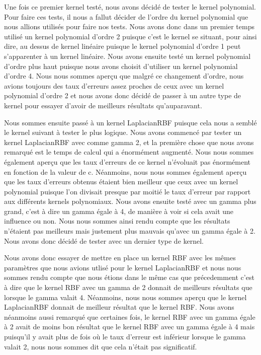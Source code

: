 \documentclass[fontsize=10pt, twoside=no]{scrartcl} %
\begin{document}
Une fois ce premier kernel testé, nous avons décidé de tester le kernel polynomial. Pour faire ces tests, il nous a fallut décider de l'ordre du kernel polynomial que nous allions utilisés pour faire nos tests. Nous avons donc dans un premier temps utilisé un kernel polynomial d'ordre 2 puisque c'est le kernel se situant, pour ainsi dire, au dessus de kernel linéaire puisque le kernel polynomial d'ordre 1 peut s'apparenter à un kernel linéaire. Nous avons ensuite testé un kernel polynomial d'ordre plus haut puisque nous avons choisit d'utiliser un kernel polynomial d'ordre 4. Nous nous sommes aperçu que malgré ce changement d'ordre, nous avions toujours des taux d'erreurs assez proches de ceux avec un kernel polynomial d'ordre 2 et nous avons donc décidé de passer à un autre type de kernel pour essayer d'avoir de meilleurs résultats qu'auparavant.

Nous sommes ensuite passé à un kernel LaplacianRBF puisque cela nous a semblé le kernel suivant à tester le plus logique. Nous avons commencé par tester un kernel LaplacianRBF avec comme gamma 2, et la première chose que nous avons remarqué est le temps de calcul qui a énormément augmenté. Nous nous sommes également aperçu que les taux d'erreurs de ce kernel n'évoluait pas énormément en fonction de la valeur de c. Néanmoins, nous nous sommes également aperçu que les taux d'erreurs obtenus étaient bien meilleur que ceux avec un kernel polynomial puisque l'on divisait presque par moitié le taux d'erreur par rapport aux différents kernels polynomiaux. Nous avons ensuite testé avec un gamma plus grand, c'est à dire un gamma égale à 4, de manière à voir si cela avait une influence ou non. Nous nous sommes ainsi rendu compte que les résultats n'étaient pas meilleurs mais justement plus mauvais qu'avec un gamma égale à 2. Nous avons donc décidé de tester avec un dernier type de kernel.

Nous avons donc essayer de mettre en place un kernel RBF avec les mêmes paramètres que nous avions utlisé pour le kernel LaplacianRBF et nous nous sommes rendu compte que nous étions dans le même cas que précedemment c'est à dire que le kernel RBF avec un gamma de 2 donnait de meilleurs résultats que lorsque le gamma valait 4. Néanmoins, nous nous sommes aperçu que le kernel LaplacianRBF donnait de meilleur résultat que le kernel RBF. Nous avons néanmoins aussi remarqué que certaines fois, le kernel RBF avec un gamma égale à 2 avait de moins bon résultat que le kernel RBF avec un gamma égale à 4 mais puisqu'il y avait plus de fois où le taux d'erreur est inférieur lorsque le gamma valait 2, nous nous sommes dit que cela n'était pas significatif.
\end{document}
